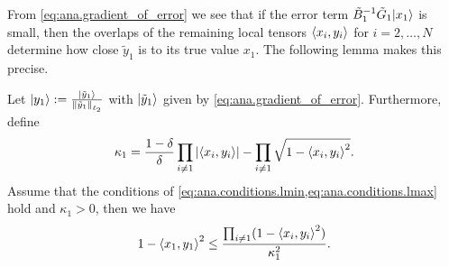From \cref{eq:ana.gradient_of_error} we see that if the error term $\tilde B_1^{-1} \tilde G_1 \ket{x_1}$ is small, then the overlaps of the remaining local tensors $\braket{x_i, y_i}$ for $i=2,\ldots,N$ determine how close $\tilde y_1$ is to its true value $x_1$.
The following lemma makes this precise.

\begin{lemma}%
  \label{lem:ana.local_error_bound}
  Let $\ket{y_1} := \frac{\ket{\tilde y_1}}{\ltwonorm{\tilde y_1}}$ with $\ket{\tilde y_1}$ given by \cref{eq:ana.gradient_of_error}.
  Furthermore, define
  \[
    \label{eq:ana.local_error_bound.def_kappa}
    \kappa_1 = \frac{1 - \delta}{\delta} \prod_{i \neq 1} {\left\vert\braket{x_i, y_i}\right\vert} - \prod_{i \neq 1} \sqrt{1 - \braket{x_i, y_i}^2}.
  \]
  Assume that the conditions of \cref{eq:ana.conditions.lmin,eq:ana.conditions.lmax} hold and $\kappa_1 > 0$, then we have
  \[
    \label{eq:ana.local_error_bound}
    1 - \Braket{x_1, y_1}^2 \le \frac{\prod_{i \neq 1} (1 - \braket{x_i, y_i}^2)}{\kappa_1^2}.
  \]
\end{lemma}
